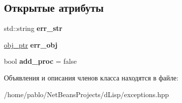 \subsection*{Открытые атрибуты}
\begin{DoxyCompactItemize}
\item 
\mbox{\label{classlisp__error_a7bd15a33b45c21b4329efae8c233d3e2}} 
std\+::string {\bfseries err\+\_\+str}
\item 
\mbox{\label{classlisp__error_aa6ffa1f360005d7d4776c05466a79042}} 
\mbox{\hyperlink{classmm__ptr}{obj\+\_\+ptr}} {\bfseries err\+\_\+obj}
\item 
\mbox{\label{classlisp__error_af91e2e580c735dca963cc27bfc3addad}} 
bool {\bfseries add\+\_\+proc} = false
\end{DoxyCompactItemize}


Объявления и описания членов класса находятся в файле\+:\begin{DoxyCompactItemize}
\item 
/home/pablo/\+Net\+Beans\+Projects/d\+Lisp/exceptions.\+hpp\end{DoxyCompactItemize}
